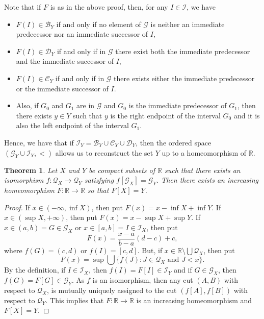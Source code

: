 \documentclass[12pt,a4paper,leqno]{amsart}
\newtheorem{thm}{Theorem}
\theoremstyle{definition}
\begin{document}
	
	Note that if $F$ is as in the above proof, then, for any $I\in \mathcal I$, we have
	\begin{itemize}
		\item  $F(I)\in \mathcal B_Y$ if and only if  no element of  $\mathcal G$ is neither an immediate predecessor nor an immediate successor of $I$,
		\item $F(I)\in \mathcal D_Y$ if and only if  in $\mathcal G$ there exist both the immediate predecessor and  the immediate successor of $I$,
		\item $F(I)\in \mathcal C_Y$ if and only if  in $\mathcal G$ there exists either  the immediate predecessor or the immediate successor of $I$.
		\item Also, if $G_0$ and $G_1$ are in $\mathcal G$ and $G_0$ is the immediate predecessor of $G_1$, then there exists $y \in Y$ such that $y$ is the right endpoint of the interval $G_0$ and it is also the left endpoint of the interval $G_1$.
	\end{itemize}
		    Hence, we have that if $\mathcal I_Y= \mathcal B_Y \cup \mathcal C_Y \cup \mathcal D_Y$, then the ordered space $(\mathcal G_Y\cup \mathcal I_Y, <)$  allows us to reconstruct the set $Y$ up to a homeomorphism of $\mathbb R$.
	
	
		
   \begin{thm}\label{tr2}
 Let $X$ and $Y$ be compact subsets of $\mathbb R$ such that there exists an isomorphism $f\colon \mathcal Q_X \to \mathcal Q_Y$  satisfying  $f[\mathcal G_X] = \mathcal G_Y$. Then  there exists an increasing homeomorphism $F\colon \mathbb R \to \mathbb R$ so that $F[X]=Y$.
  \end{thm}
  \begin{proof} 
If $x\in (-\infty, \inf X)$, then put $F(x)=x-\inf X + \inf Y$. If $x\in (\sup X, +\infty)$, then put $F(x)=x-\sup X + \sup Y$.
If $x\in (a, b)=G\in \mathcal G_X$ or $x\in [a, b]=I\in \mathcal I_X$, then put   $$F(x)=\frac{x-a}{b-a}(d-c) + c, $$ where $f(G)=(c,d)$ or $f(I)=[c,d]$. 
But, if $x\in \mathbb R \setminus\bigcup \mathcal Q_X$, then put $$ F(x)= \sup \bigcup \{f(J)\colon J \in \mathcal Q_X\mbox{ and } J < x\}.$$ By the definition,   if $I\in \mathcal I_X$, then $f(I)=F[I]\in \mathcal I_Y$ and if $G\in \mathcal G_X$, then $f(G)=F[G]\in \mathcal G_Y$. As $f$ is an isomorphism,  then any cut $(A,B)$ with respect to $\mathcal Q_X$, is mutually uniquely assigned to the cut $(f[A],f[B])$ with respect to $\mathcal Q_Y$. This implies that  $F\colon \mathbb R \to \mathbb R$ is an increasing homeomorphism and $F[X]=Y$. 
  \end{proof}
	
\end{document}
